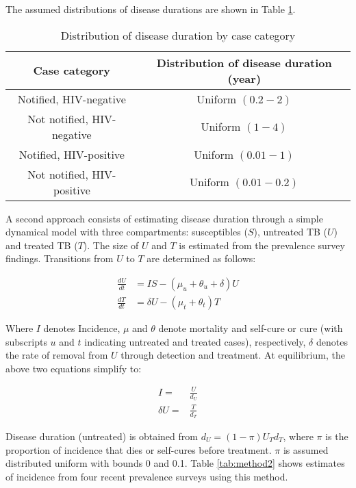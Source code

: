 The assumed distributions of disease durations are shown in Table \ref{tab:duration}.

\begin{table} 
    \begin{tabular}{ c c }
        \hline
        Case category & Distribution of disease duration (year) \\ 
        \hline
        Notified, HIV-negative & Uniform $(0.2 - 2)$ \\ 
        Not notified, HIV-negative & Uniform $(1 - 4)$ \\ 
        Notified, HIV-positive & Uniform $(0.01 - 1)$ \\ 
        Not notified, HIV-positive & Uniform $(0.01 - 0.2)$ \\ 
        \hline
    \end{tabular} 
    \caption{Distribution of disease duration by case category} 
    \label{tab:duration}
\end{table}



A second approach consists of estimating disease duration through a simple dynamical model with three compartments: susceptibles ($S$), untreated TB ($U$) and treated TB ($T$). The size of $U$ and $T$ is estimated from the prevalence survey findings. Transitions from $U$ to $T$ are determined as follows:

\begin{align*}
\frac{dU}{dt} &= I S - (\mu_u + \theta_u + \delta)U \\
\frac{dT}{dt} &= \delta U - (\mu_t + \theta_t) T
\end{align*}

Where $I$ denotes Incidence, $\mu$ and $\theta$ denote mortality and self-cure or cure (with subscripts $u$ and $t$ indicating untreated and treated cases), respectively, $\delta$ denotes the rate of removal from $U$ through detection and treatment. At equilibrium, the above two equations simplify to: 

\begin{align*}
I = &\frac{U}{d_U} \\
\delta U = &\frac{T}{d_T}
\end{align*}

Disease duration (untreated) is obtained from $d_U=(1-\pi)U_T d_T$, where $\pi$ is the proportion of incidence that dies or self-cures before treatment. $\pi$ is assumed distributed uniform with bounds 0 and 0.1. Table \ref{tab:method2} shows estimates of incidence from four recent prevalence surveys using this method. 

